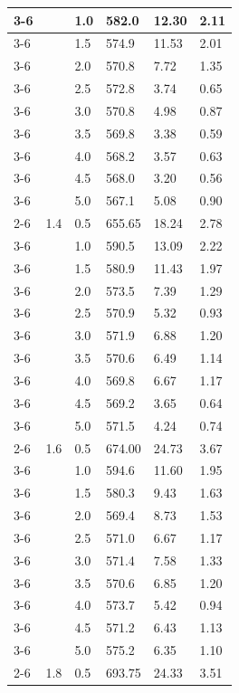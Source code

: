 \begin{longtable}{|p{}|p{}|p{}|p{}|p{}|p{}|}
	\cline{3-6}
	& & 1.0 & 582.0 & 12.30 & 2.11 \\
	\cline{3-6}
	& & 1.5 & 574.9 & 11.53 & 2.01 \\
	\cline{3-6}
	& & 2.0 & 570.8 & 7.72 & 1.35 \\
	\cline{3-6}
	& & 2.5 & 572.8 & 3.74 & 0.65 \\
	\cline{3-6}
	& & 3.0 & 570.8 & 4.98 & 0.87 \\
	\cline{3-6}
	& & 3.5 & 569.8 & 3.38 & 0.59 \\
	\cline{3-6}
	& & 4.0 & 568.2 & 3.57 & 0.63 \\
	\cline{3-6}
	& & 4.5 & 568.0 & 3.20 & 0.56 \\
	\cline{3-6}
	& & 5.0 & 567.1 & 5.08 & 0.90 \\
	\cline{2-6}
	& 1.4 & 0.5 & 655.65 & 18.24 & 2.78 \\
	\cline{3-6}
	& & 1.0 & 590.5 & 13.09 & 2.22 \\
	\cline{3-6}
	& & 1.5 & 580.9 & 11.43 & 1.97 \\
	\cline{3-6}
	& & 2.0 & 573.5 & 7.39 & 1.29 \\
	\cline{3-6}
	& & 2.5 & 570.9 & 5.32 & 0.93 \\
	\cline{3-6}
	& & 3.0 & 571.9 & 6.88 & 1.20 \\
	\cline{3-6}
	& & 3.5 & 570.6 & 6.49 & 1.14 \\
	\cline{3-6}
	& & 4.0 & 569.8 & 6.67 & 1.17 \\
	\cline{3-6}
	& & 4.5 & 569.2 & 3.65 & 0.64 \\
	\cline{3-6}
	& & 5.0 & 571.5 & 4.24 & 0.74 \\
	\cline{2-6}
	& 1.6 & 0.5 & 674.00 & 24.73 & 3.67 \\
	\cline{3-6}
	& & 1.0 & 594.6 & 11.60 & 1.95 \\
	\cline{3-6}
	& & 1.5 & 580.3 & 9.43 & 1.63 \\
	\cline{3-6}
	& & 2.0 & 569.4 & 8.73 & 1.53 \\
	\cline{3-6}
	& & 2.5 & 571.0 & 6.67 & 1.17 \\
	\cline{3-6}
	& & 3.0 & 571.4 & 7.58 & 1.33 \\
	\cline{3-6}
	& & 3.5 & 570.6 & 6.85 & 1.20 \\
	\cline{3-6}
	& & 4.0 & 573.7 & 5.42 & 0.94 \\
	\cline{3-6}
	& & 4.5 & 571.2 & 6.43 & 1.13 \\
	\cline{3-6}
	& & 5.0 & 575.2 & 6.35 & 1.10 \\
	\cline{2-6}
	& 1.8 & 0.5 & 693.75 & 24.33 & 3.51 \\

\end{longtable}
